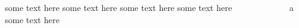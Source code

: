 \documentclass{beamer}
\begin{document}
\begin{frame}
  \frametitle{}
  \begin{columns} 
    \begin{column}{0.5\textwidth}    
      some text here some text here some text here some text here some text
      here
    \end{column} 
    \begin{column}{0.5\textwidth}       
      \begin{figure}[p]
        \caption{a}
      \end{figure}
    \end{column} 
  \end{columns} 
\end{frame}


%

\end{document}
